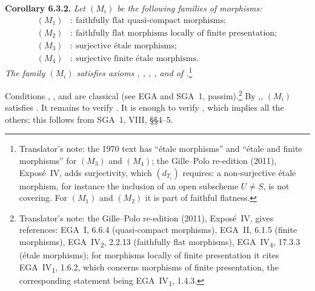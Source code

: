 \medskip
\noindent{}\textbf{Corollary 6.3.2.}
\textit{Let \((M_i)\) be the following families of morphisms:}
\begin{align*}
 (M_1)&:\ \text{faithfully flat quasi-compact morphisms};\\
 (M_2)&:\ \text{faithfully flat morphisms locally of finite presentation};\\
 (M_3)&:\ \text{surjective \'{e}tale morphisms};\\
 (M_4)&:\ \text{surjective finite \'{e}tale morphisms}.
\end{align*}
\textit{The family \((M_i)\) satisfies axioms , , ,
, and  of .}\footnote{Translator's note: the 1970 text has ``\'etale
morphisms'' and ``\'etale and finite morphisms'' for \((M_3)\) and \((M_4)\);
the Gille--Polo re-edition (2011), Expos\'e~IV, adds surjectivity, which
\((d_{T_i})\) requires: a non-surjective \'etale morphism, for instance the
inclusion of an open subscheme \(U\ne S\), is not covering. For \((M_1)\) and
\((M_2)\) it is part of faithful flatness.}

Conditions , , and  are classical (see EGA and SGA~1,
passim).\footnote{Translator's note: the Gille--Polo re-edition (2011), Expos\'e~IV, gives
references: EGA~I, 6.6.4 (quasi-compact morphisms), EGA~II, 6.1.5 (finite
morphisms), EGA~IV\textsubscript{2}, 2.2.13 (faithfully flat morphisms),
EGA~IV\textsubscript{4}, 17.3.3 (\'etale morphisms); for morphisms locally of
finite presentation it cites EGA~IV\textsubscript{1}, 1.6.2, which concerns
morphisms of finite presentation, the corresponding statement being
EGA~IV\textsubscript{1}, 1.4.3.}
By ,, \((M_i)\) satisfies . It remains to verify
. It is enough to verify , which implies all the
others; this follows from SGA~1, VIII, \S\S4--5.

